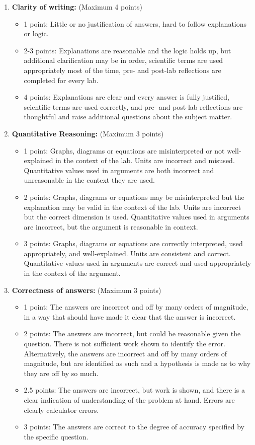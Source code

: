 \documentclass[10pt]{article}
\begin{document}
\begin{enumerate}
\item \textbf{Clarity of writing:} (Maximum 4 points)
\begin{itemize}
	\item 1 point: Little or no justification of answers, hard to follow explanations or logic.
	\item 2-3 points: Explanations are reasonable and the logic holds up, but additional clarification may be in order, scientific terms are used appropriately most of the time, pre- and post-lab reflections are completed for every lab.
	\item 4 points: Explanations are clear and every answer is fully justified, scientific terms are used correctly, and pre- and post-lab reflections are thoughtful and raise additional questions about the subject matter.
\end{itemize}
\item \textbf{Quantitative Reasoning:} (Maximum 3 points)
\begin{itemize}
	\item 1 point: Graphs, diagrams or equations are misinterpreted or not well-explained in the context of the lab.  Units are incorrect and misused.  Quantitative values used in arguments are both incorrect and unreasonable in the context they are used.  
	\item 2 points: Graphs, diagrams or equations may be misinterpreted but the explanation may be valid in the context of the lab.  Units are incorrect but the correct dimension is used.  Quantitative values used in arguments are incorrect, but the argument is reasonable in context.
	\item 3 points: Graphs, diagrams or equations are correctly interpreted, used appropriately, and well-explained.  Units are consistent and correct.  Quantitative values used in arguments are correct and used appropriately in the context of the argument.
\end{itemize}
\item \textbf{Correctness of answers:} (Maximum 3 points)
\begin{itemize}
	\item 1 point: The answers are incorrect and off by many orders of magnitude, in a way that should have made it clear that the answer is incorrect.
	\item 2 points: The answers are incorrect, but could be reasonable given the question. There is not sufficient work shown to identify the error. Alternatively, the answers are incorrect and off by many orders of magnitude, but are identified as such and a hypothesis is made as to why they are off by so much.
    \item 2.5 points: The answers are incorrect, but work is shown, and there is a clear indication of understanding of the problem at hand.  Errors are clearly calculator errors.
	\item 3 points: The answers are correct to the degree of accuracy specified by the specific question.
\end{itemize}
\end{enumerate}
\end{document}
